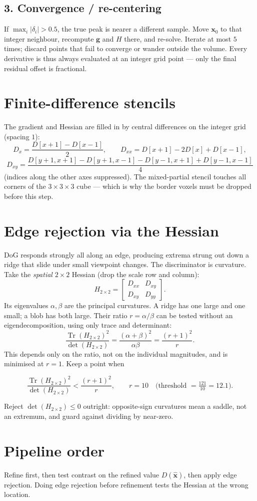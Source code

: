 \documentclass[11pt]{article}
\begin{document}
\subsection*{3. Convergence / re-centering}
If $\max_i |\delta_i| > 0.5$, the true peak is nearer a different sample. Move
$\mathbf{x}_0$ to that integer neighbour, recompute $\mathbf{g}$ and $H$ there, and re-solve.
Iterate at most $5$ times; discard points that fail to converge or wander outside the volume.
Every derivative is thus always evaluated at an integer grid point --- only the final
residual offset is fractional.

\section{Finite-difference stencils}

The gradient and Hessian are filled in by central differences on the integer grid
(spacing $1$):
\[
D_x = \frac{D[x{+}1] - D[x{-}1]}{2},
\qquad
D_{xx} = D[x{+}1] - 2D[x] + D[x{-}1],
\]
\[
D_{xy} = \frac{D[y{+}1,x{+}1] - D[y{+}1,x{-}1] - D[y{-}1,x{+}1] + D[y{-}1,x{-}1]}{4}
\]
(indices along the other axes suppressed). The mixed-partial stencil touches all corners
of the $3\times 3\times 3$ cube --- which is why the border voxels must be dropped before
this step.

\section{Edge rejection via the Hessian}

DoG responds strongly all along an edge, producing extrema strung out down a ridge that
slide under small viewpoint changes. The discriminator is curvature. Take the
\emph{spatial} $2\times 2$ Hessian (drop the scale row and column):
\[
H_{2\times 2} =
\begin{bmatrix} D_{xx} & D_{xy} \\ D_{xy} & D_{yy} \end{bmatrix}.
\]
Its eigenvalues $\alpha, \beta$ are the principal curvatures. A ridge has one large and one
small; a blob has both large. Their ratio $r = \alpha/\beta$ can be tested without an
eigendecomposition, using only trace and determinant:
\[
\frac{\operatorname{Tr}(H_{2\times 2})^2}{\det(H_{2\times 2})}
= \frac{(\alpha + \beta)^2}{\alpha\beta}
= \frac{(r + 1)^2}{r}.
\]
This depends only on the ratio, not on the individual magnitudes, and is minimised at
$r = 1$. Keep a point when
\begin{keybox}
\[
\frac{\operatorname{Tr}(H_{2\times 2})^2}{\det(H_{2\times 2})} < \frac{(r+1)^2}{r},
\qquad r = 10
\quad\Big(\text{threshold } = \tfrac{121}{10} = 12.1\Big).
\]
\end{keybox}
Reject $\det(H_{2\times 2}) \le 0$ outright: opposite-sign curvatures mean a saddle, not an
extremum, and guard against dividing by near-zero.

\section*{Pipeline order}

Refine first, then test contrast on the refined value $D(\hat{\mathbf{x}})$, then apply edge
rejection. Doing edge rejection before refinement tests the Hessian at the wrong location.
\end{document}
